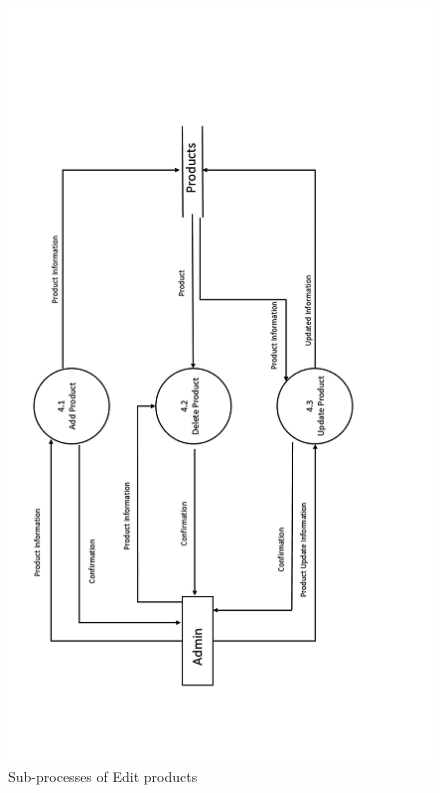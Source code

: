  \begin{figure}
 \centering
\includegraphics{figures/4final.png}
\caption{Sub-processes of Edit products}
\end{figure}



